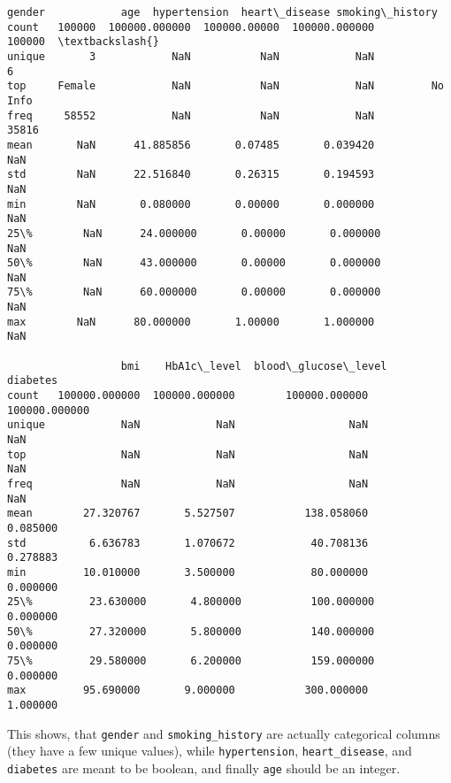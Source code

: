 \documentclass[11pt]{article}
\makeatletter
\newcommand{\boxspacing}{\kern\kvtcb@left@rule\kern\kvtcb@boxsep}
\newcommand{\prompt}[4]{
        {\ttfamily\llap{{\color{#2}[#3]:\hspace{3pt}#4}}\vspace{-\baselineskip}}
    }
\makeatother
\begin{document}
            \begin{tcolorbox}[breakable, size=fbox, boxrule=.5pt, pad at break*=1mm, opacityfill=0]
\prompt{Out}{outcolor}{158}{\boxspacing}
\begin{Verbatim}[commandchars=\\\{\}]
        gender            age  hypertension  heart\_disease smoking\_history
count   100000  100000.000000  100000.00000  100000.000000          100000  \textbackslash{}
unique       3            NaN           NaN            NaN               6
top     Female            NaN           NaN            NaN         No Info
freq     58552            NaN           NaN            NaN           35816
mean       NaN      41.885856       0.07485       0.039420             NaN
std        NaN      22.516840       0.26315       0.194593             NaN
min        NaN       0.080000       0.00000       0.000000             NaN
25\%        NaN      24.000000       0.00000       0.000000             NaN
50\%        NaN      43.000000       0.00000       0.000000             NaN
75\%        NaN      60.000000       0.00000       0.000000             NaN
max        NaN      80.000000       1.00000       1.000000             NaN

                  bmi    HbA1c\_level  blood\_glucose\_level       diabetes
count   100000.000000  100000.000000        100000.000000  100000.000000
unique            NaN            NaN                  NaN            NaN
top               NaN            NaN                  NaN            NaN
freq              NaN            NaN                  NaN            NaN
mean        27.320767       5.527507           138.058060       0.085000
std          6.636783       1.070672            40.708136       0.278883
min         10.010000       3.500000            80.000000       0.000000
25\%         23.630000       4.800000           100.000000       0.000000
50\%         27.320000       5.800000           140.000000       0.000000
75\%         29.580000       6.200000           159.000000       0.000000
max         95.690000       9.000000           300.000000       1.000000
\end{Verbatim}
\end{tcolorbox}
        
    This shows, that \texttt{gender} and \texttt{smoking\_history} are
actually categorical columns (they have a few unique values), while
\texttt{hypertension}, \texttt{heart\_disease}, and \texttt{diabetes}
are meant to be boolean, and finally \texttt{age} should be an integer.
\end{document}
